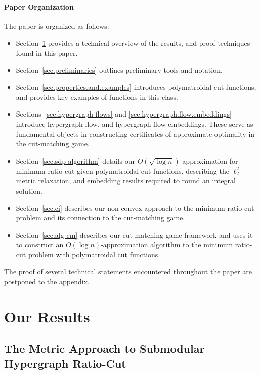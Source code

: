 \documentclass[letterpaper]{article}
\begin{document}
\paragraph{Paper Organization}
The paper is organized as follows:
\begin{itemize}
\item Section~\ref{sec.results} provides a technical overview of the results, and proof techniques found in this paper.

\item Section~\ref{sec.preliminaries} outlines preliminary tools and notation.

\item Section~\ref{sec.properties.and.examples} introduces polymatroidal cut functions, and provides key examples of functions in this class.

\item Sections~\ref{sec.hypergraph-flows} and \ref{sec.hypergraph.flow.embeddings} introduce hypergraph flow, and hypergraph flow embeddings. These serve as fundamental objects in constructing certificates of approximate optimality in the cut-matching game.

\item Section~\ref{sec.sdp-algorithm} details our $O(\sqrt{\log n})$-approximation for minimum ratio-cut given polymatroidal cut functions, describing the $\ell_2^2$-metric relaxation, and embedding results required to round an integral solution.

\item Section~\ref{sec.ci} describes our non-convex approach to the minimum ratio-cut problem and its connection to the cut-matching game.

\item Section~\ref{sec.alg-cm} describes our cut-matching game framework and uses it to construct an $O(\log n)$-approximation algorithm to the minimum ratio-cut problem with polymatroidal cut functions.
\end{itemize}

\noindent
The proof of several technical statements encountered throughout the paper are postponed to the appendix.
 

\section{Our Results}
\label{sec.results}


\subsection{The Metric Approach to Submodular Hypergraph Ratio-Cut}
\label{sec.results.metric}
\end{document}
